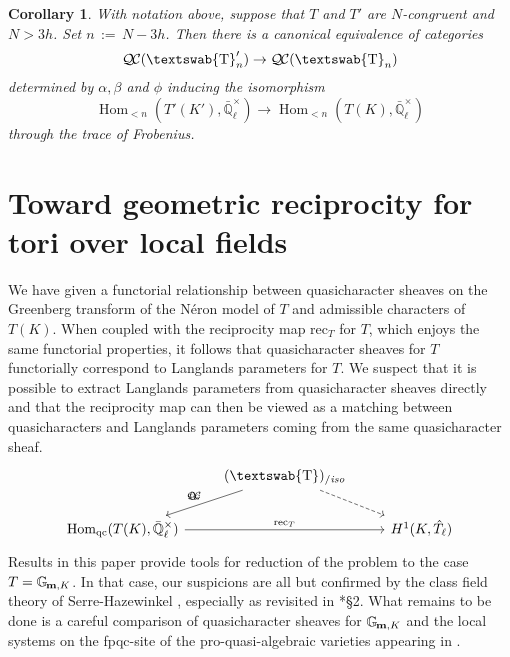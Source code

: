 \documentclass[11pt]{amsart}
\DeclareRobustCommand{\VAN}[3]{#2}
\newcommand{\mathswab}[1]{\operatorname{\textswab{#1}}}
\theoremstyle{plain}
\newtheorem{corollary}[theorem]{Corollary}
\theoremstyle{definition}
\theoremstyle{remark}
\newcommand{\EE}{\mathbb{\bar Q}_\ell}
\newcommand{\EEx}{\EE^\times}
\DeclareMathOperator{\Hom}{Hom}
\newcommand{\ceq}{{\, :=\, }}
\newcommand{\Gm}[1]{\mathbb{G}_{\hskip-1pt\textbf{m},#1}}
\newcommand{\GN}[1]{\mathswab{#1}}
\newcommand{\QC}{{\mathcal{Q\hskip-0.8pt C}}}
\newcommand{\QCiso}[1]{\QC(#1)_{/\textit{iso}}}
\newcommand{\trFrob}[1]{t_{#1}}
\begin{document}
\begin{corollary}\label{cor:transfer}
 With notation above, suppose that $T$ and $T'$ are $N$-congruent and $N > 3h$.  Set $n \ceq N-3h$.
 Then there is a canonical equivalence of categories
 \[
  \QC(\GN{T}'_{n}) \to \QC(\GN{T}_{n})
 \]
 determined by $\alpha, \beta$ and $\phi$ inducing the isomorphism
 \[
  \Hom_{<n}(T'(K'), \EEx) \to \Hom_{<n}(T(K), \EEx)
 \]
 through the trace of Frobenius.
\end{corollary}


\section{Toward geometric reciprocity for tori over local fields}
\label{sec:reciprocity}

We have given a functorial relationship between quasicharacter sheaves 
on the Greenberg transform of the Néron model of $T$ 
and admissible characters of $T(K)$.
When coupled with the reciprocity map $\text{rec}_T $ for $T$, 
which enjoys the same functorial properties, 
it follows that quasicharacter sheaves for $T$ 
functorially correspond to Langlands parameters for $T$.
We suspect that it is possible to extract Langlands parameters 
from quasicharacter sheaves directly and that the reciprocity map 
can then be viewed as a matching between quasicharacters and Langlands parameters coming
 from the same quasicharacter sheaf. 
 \[
\begin{tikzcd}
\ & \arrow[swap]{dl}{\trFrob{G}} \QCiso{\GN{T}} \arrow[dashed]{dr} & \\
\Hom_{\text{qc}}(T(K),\EEx) \arrow{rr}{\text{rec}_T} && H^1(K,\hat{T}_\ell)
\end{tikzcd}
\]
 Results in this paper provide tools for reduction of the problem to the case $T=\Gm{K}$. 
 In that case, our suspicions are all but confirmed 
 by the class field theory of Serre-Hazewinkel
 ,
 especially as revisited in \cite{suzuki-yoshida:12a}*{\S 2}. 
 What remains to be done is a careful comparison of 
 quasicharacter sheaves for $\Gm{K}$ and the local systems on
  the fpqc-site of the pro-quasi-algebraic varieties appearing in \cite{suzuki-yoshida:12a}. 


\DeclareRobustCommand{\VAN}[3]{#3}

\end{document}
